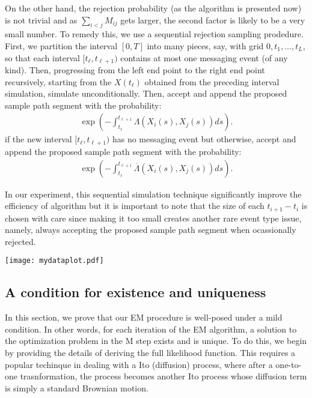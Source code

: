 \documentclass[12pt]{article}%
\begin{document}
On the other hand, the rejection probability (as the algorithm is presented now) is not trivial and as $\sum_{i<j} M_{ij}$ gets larger, the second factor is likely to be a very small number.  To remedy this, we use a sequential rejection sampling prodedure.  First, we partition the interval $[0,T]$ into many pieces, say, with grid $0,t_1,\ldots, t_L$, so that each interval $[t_{\ell},t_{\ell+1})$ contains at most one messaging event (of any kind). Then, progressing from the left end point to the right end point recursively, starting from the $X(t_{\ell})$ obtained from the preceding interval simulation, simulate unconditionally.  Then, accept and append the proposed sample path segment with the probability:
\begin{eqnarray}
\exp\left(-\int_{t_{\ell}}^{t_{\ell+1}} \Lambda(X_i(s),X_j(s)) ds\right).
\end{eqnarray}
if the new interval $[t_{\ell},t_{\ell+1})$ has no messaging event but otherwise, accept and append the proposed sample path segment with the probability:
\begin{eqnarray}
\exp\left(-\int_{t_{\ell}}^{t_{\ell+1}} \overline{\Lambda}(X_i(s),X_j(s)) ds\right).
\end{eqnarray}

In our experiment, this sequential simulation technique significantly improve the efficiency of algorithm but it is important to note that the size of each $t_{i+1} - t_i$ is chosen with care since making it too small creates another rare event type issue, namely, always accepting the proposed sample path segment when ocassionally rejected.   
 
\texttt{[image: mydataplot.pdf]}

\subsection{A condition for existence and uniqueness}
In this section, we prove that our EM procedure is well-posed under
a mild condition.  In other words, for each iteration of the EM algorithm,
a solution to the optimization problem in the M step exists and is unique.
To do this, we begin by providing the details 
of deriving the full likelihood function. This requires a popular techinque
in dealing with a Ito (diffusion) process, where after a one-to-one trasnformation, the process becomes another Ito process whose diffusion term is simply a standard Brownian motion.
\end{document}
